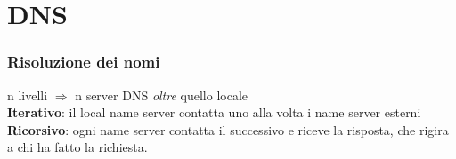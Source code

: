 \documentclass[12pt]{article}
\begin{document}
\section{DNS}
\subsubsection{Risoluzione dei nomi}
n livelli $\Rightarrow$ n server DNS \textit{oltre} quello locale\\
\textbf{Iterativo}: il local name server contatta uno alla volta i name server esterni\\
\textbf{Ricorsivo}: ogni name server contatta il successivo e riceve la risposta, che rigira a chi ha fatto la richiesta.
\end{document}
